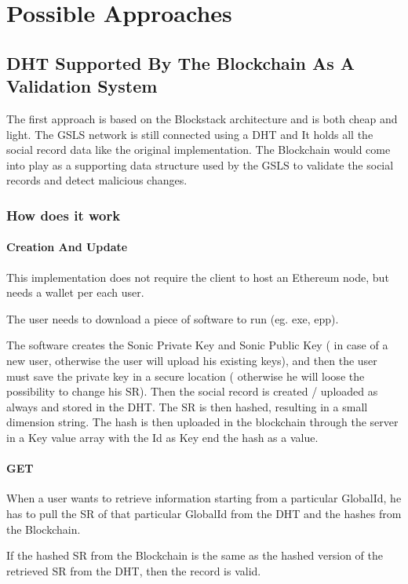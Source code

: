 \section{Possible Approaches}

\subsection{DHT Supported By The Blockchain As A Validation System}
The first approach is based on the Blockstack architecture and is both cheap and light. The GSLS network is still connected using a DHT and It holds all the social record data like the original implementation. The Blockchain would come into play as a supporting data structure used by the GSLS to validate the social records and detect malicious changes.

\subsubsection{How does it work}
\paragraph{Creation And Update}

This implementation does not require the client to host an Ethereum node, but needs a wallet per each user.

The user needs to download a piece of software to run (eg. exe, epp).

The software creates the Sonic Private Key and Sonic Public Key ( in case of a new user, otherwise the user will upload his existing keys), and then the user must save the private key in a secure location ( otherwise he will loose the possibility to change his SR).
Then the social record is created / uploaded as always and stored in the DHT.
The SR is then hashed, resulting in a small dimension string.
The hash is then uploaded in the blockchain through the server in a Key value array with the Id as Key end the hash as a value.

\paragraph{GET}

When a user wants to retrieve information starting from a particular GlobalId, he has to pull the SR of that particular GlobalId from the DHT and the hashes from the Blockchain.

If the hashed SR from the Blockchain is the same as the hashed version of the retrieved SR from the DHT, then the record is valid.


